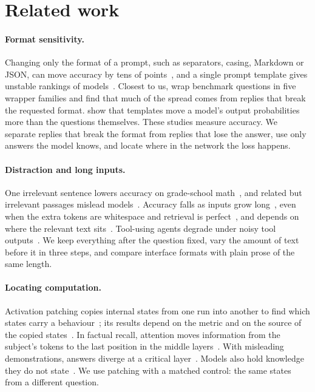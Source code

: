 \section{Related work}
\label{sec:related}

\paragraph{Format sensitivity.} Changing only the format of a prompt, such as separators, casing, Markdown or JSON, can move accuracy by tens of points~\citep{sclar2024quantifying,he2024does}, and a single prompt template gives unstable rankings of models~\citep{mizrahi2024state}. Closest to us, \citet{mehta2026format} wrap benchmark questions in five wrapper families and find that much of the spread comes from replies that break the requested format. \citet{liu2026understanding} show that templates move a model's output probabilities more than the questions themselves. These studies measure accuracy. We separate replies that break the format from replies that lose the answer, use only answers the model knows, and locate where in the network the loss happens.

\paragraph{Distraction and long inputs.} One irrelevant sentence lowers accuracy on grade-school math~\citep{shi2023large}, and related but irrelevant passages mislead models~\citep{wu2024how}. Accuracy falls as inputs grow long~\citep{levy2024same,hsieh2024ruler}, even when the extra tokens are whitespace and retrieval is perfect~\citep{du2025context}, and depends on where the relevant text sits~\citep{liu2024lost}. Tool-using agents degrade under noisy tool outputs~\citep{wang2026agentnoisebench}. We keep everything after the question fixed, vary the amount of text before it in three steps, and compare interface formats with plain prose of the same length.

\paragraph{Locating computation.} Activation patching copies internal states from one run into another to find which states carry a behaviour~\citep{vig2020causal,meng2022locating,wang2023interpretability}; its results depend on the metric and on the source of the copied states~\citep{zhang2024towards,heimersheim2024how}. In factual recall, attention moves information from the subject's tokens to the last position in the middle layers~\citep{geva2023dissecting}. With misleading demonstrations, answers diverge at a critical layer~\citep{halawi2024overthinking}. Models also hold knowledge they do not state~\citep{orgad2025llms,gekhman2025inside}. We use patching with a matched control: the same states from a different question.

